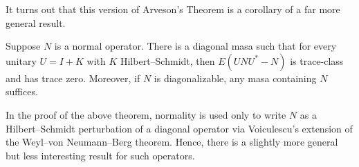 \documentclass{article}
\begin{document}
It turns out that this version of Arveson's Theorem is a corollary of a far more general result.

\begin{theorem}
  Suppose $N$ is a normal operator.
  There is a diagonal masa such that for every unitary $U = I + K$ with $K$ Hilbert--Schmidt, then $E(UNU^{*}-N)$ is trace-class and has trace zero.
  Moreover, if $N$ is diagonalizable, any masa containing $N$ suffices.
\end{theorem}

\begin{remark}
  In the proof of the above theorem, normality is used only to write $N$ as a Hilbert--Schmidt perturbation of a diagonal operator via Voiculescu's extension of the Weyl--von Neumann--Berg theorem.
  Hence, there is a slightly more general but less interesting result for such operators.
\end{remark}


\end{document}
